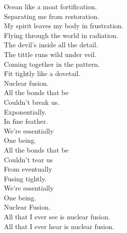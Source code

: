 Ocean like a moat fortification. \\
Separating me from restoration. \\
My spirit leaves my body in frustration. \\
Flying through the world in radiation. \\

The devil's inside all the detail. \\
The tittle runs wild under veil. \\
Coming together in the pattern. \\
Fit tightly like a dovetail. \\

Nuclear fusion. \\

All the bonds that be \\
Couldn't break us. \\
Exponentially. \\
In fine feather. \\
We're essentially \\
One being. \\

All the bonds that be \\
Couldn't tear us \\
From eventually \\
Fusing tightly. \\
We're essentially \\
One being. \\
Nuclear Fusion. \\

All that I ever see is nuclear fusion. \\
All that I ever hear is nuclear fusion. \\





